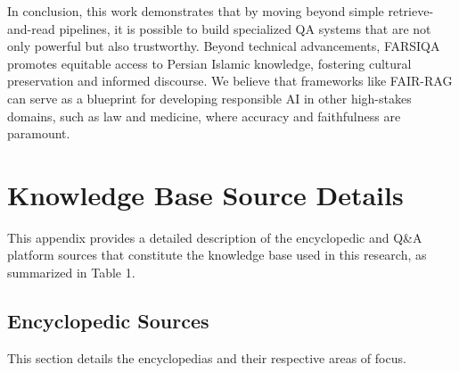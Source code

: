 \documentclass[11pt]{article}
\begin{document}
In conclusion, this work demonstrates that by moving beyond simple retrieve-and-read pipelines, it is possible to build specialized QA systems that are not only powerful but also trustworthy. Beyond technical advancements, FARSIQA promotes equitable access to Persian Islamic knowledge, fostering cultural preservation and informed discourse. We believe that frameworks like FAIR-RAG can serve as a blueprint for developing responsible AI in other high-stakes domains, such as law and medicine, where accuracy and faithfulness are paramount.




\appendix

\section{Knowledge Base Source Details}
\label{sec:appendix-kb-sources}

This appendix provides a detailed description of the encyclopedic and Q\&A platform sources that constitute the knowledge base used in this research, as summarized in Table 1.

\subsection{Encyclopedic Sources}

This section details the encyclopedias and their respective areas of focus.
\end{document}
